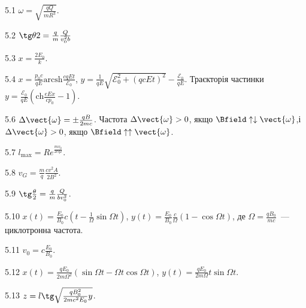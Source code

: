 \protect \section *{\protect {}}
\begin{Solution}{5.{1}}
	$\omega = \sqrt{\frac{qQ}{mR^3}}$.
\end{Solution}
\begin{Solution}{5.{2}}
	$\tg\theta2 = \frac qm\frac{Q}{v_0^2b}$
\end{Solution}
\begin{Solution}{5.{3}}
	$x = \frac{2E_0}{k}$.
\end{Solution}
\begin{Solution}{5.{4}}
	$x = \frac{p_0c}{qE} \mathrm{arcsh}\frac{cqEt}{\mathcal{E}_0}$, $y = \frac{1}{qE}\sqrt{\mathcal{E}_0^2 + (qcEt)^2} - \frac{\mathcal{E}_0}{qE}$. Траєкторія частинки $y = \frac{\mathcal{E}_0}{qE} \left( \mathrm{ch}\frac{eEx}{cp_0} - 1\right) $.
\end{Solution}
\begin{Solution}{5.{6}}
	$\Delta\vect{\omega} = \pm\frac{qB}{2mc}$. Частота $\Delta\vect{\omega}>0$, якщо $\Bfield \uparrow\downarrow \vect{\omega}$,і
	$\Delta\vect{\omega}>0$, якщо $\Bfield \uparrow\uparrow \vect{\omega}$.
\end{Solution}
\begin{Solution}{5.{7}}
	$l_{\max} = Re^{\frac{mv_0}{2cqI}}$.
\end{Solution}
\begin{Solution}{5.{8}}
	$v_G = \frac{m}{q}\frac{cv^2A}{2B^2}.$
\end{Solution}
\begin{Solution}{5.{9}}
	$\tg\frac{\theta}{2} = \frac qm \frac{Q}{bv_0^2}$.
\end{Solution}
\begin{Solution}{5.{10}}
	$x(t)  = \frac{E_0}{B_0}c\left( t - \frac{1}{\Omega}\sin\Omega t \right) $,
	$y(t)  = \frac{E_0}{B_0} \frac{c}{\Omega}\left( 1 - \cos\Omega t \right) $, де $\Omega = \frac{qB_0}{mc}$~--- циклотронна частота.
\end{Solution}
\begin{Solution}{5.{11}}
	$v_0 = c\frac{E_0}{B_0}$.
\end{Solution}
\begin{Solution}{5.{12}}
	$x(t)  = \frac{qE_0}{2m\Omega^2}\left( \sin\Omega t - \Omega t\cos\Omega t \right) $,
	$y(t)  = \frac{qE_0}{2m\Omega}t\sin\Omega t$.
\end{Solution}
\begin{Solution}{5.{13}}
	$z = l\tg\sqrt{\frac{qB_0^2}{2mc^2E_0}y}$.
\end{Solution}
